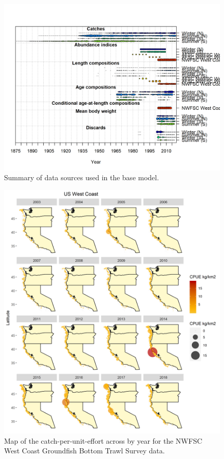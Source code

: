 \documentclass[12pt,]{article}
\begin{document}
\begin{figure}
\centering
\includegraphics{r4ss/plots_mod1/data_plot2.png}
\caption{Summary of data sources used in the base model.
\label{fig:data_plot}}
\end{figure}

\FloatBarrier

\begin{figure}
\centering
\includegraphics{Figures/NWFSC_CPUE_Map_Year.png}
\caption{Map of the catch-per-unit-effort across by year for the NWFSC
West Coast Groundfish Bottom Trawl Survey data. \label{fig:nw_map}}
\end{figure}
\end{document}
